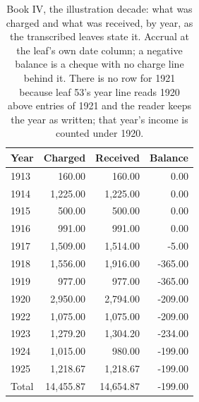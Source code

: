 \begin{table}[htbp]\centering\small
\caption{Book IV, the illustration decade: what was charged and what was received, by year, as the transcribed leaves state it. Accrual at the leaf's own date column; a negative balance is a cheque with no charge line behind it. There is no row for 1921 because leaf 53's year line reads 1920 above entries of 1921 and the reader keeps the year as written; that year's income is counted under 1920.}\label{tab:ill}
\begin{tabular}{lrrr}\toprule Year & Charged & Received & Balance\\\midrule
1913 & 160.00 & 160.00 & 0.00\\
1914 & 1,225.00 & 1,225.00 & 0.00\\
1915 & 500.00 & 500.00 & 0.00\\
1916 & 991.00 & 991.00 & 0.00\\
1917 & 1,509.00 & 1,514.00 & -5.00\\
1918 & 1,556.00 & 1,916.00 & -365.00\\
1919 & 977.00 & 977.00 & -365.00\\
1920 & 2,950.00 & 2,794.00 & -209.00\\
1922 & 1,075.00 & 1,075.00 & -209.00\\
1923 & 1,279.20 & 1,304.20 & -234.00\\
1924 & 1,015.00 & 980.00 & -199.00\\
1925 & 1,218.67 & 1,218.67 & -199.00\\
\midrule Total & 14,455.87 & 14,654.87 & -199.00\\\bottomrule\end{tabular}\end{table}


